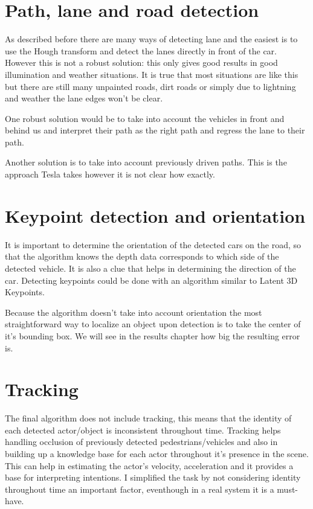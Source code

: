 \section{Path, lane and road detection}

As described before there are many ways of detecting lane and the easiest is to
use the Hough transform and detect the lanes directly in front of the car.
However this is not a robust solution: this only gives good results in good
illumination and weather situations. It is true that most situations are like
this but there are still many unpainted roads, dirt roads or simply due to
lightning and weather the lane edges won't be clear.

One robust solution would be to take into account the vehicles in front and
behind us and interpret their path as the right path and regress the lane to
their path. 

Another solution is to take into account previously driven paths. This is the
approach Tesla takes however it is not clear how exactly.

\section{Keypoint detection and orientation}

It is important to determine the orientation of the detected cars on the road,
so that the algorithm knows the depth data corresponds to which side of the
detected vehicle. It is also a clue that helps in determining the direction
of the car. Detecting keypoints could be done with an algorithm similar to Latent 3D
Keypoints\cite{suwajanakorn_discovery_2018}.

Because the algorithm doesn't take into account orientation the most
straightforward way to localize an object upon detection is to take the center
of it's bounding box. We will see in the results chapter how big the resulting error is.

\section{Tracking}

The final algorithm does not include tracking, this means that the identity of
each detected actor/object is inconsistent throughout time. Tracking helps
handling occlusion of previously detected pedestrians/vehicles and also in
building up a knowledge base for each actor throughout it's presence in the
scene. This can help in estimating the actor's velocity, acceleration and it
provides a base for interpreting intentions. I simplified the task by not
considering identity throughout time an important factor, eventhough in a real
system it is a must-have.

